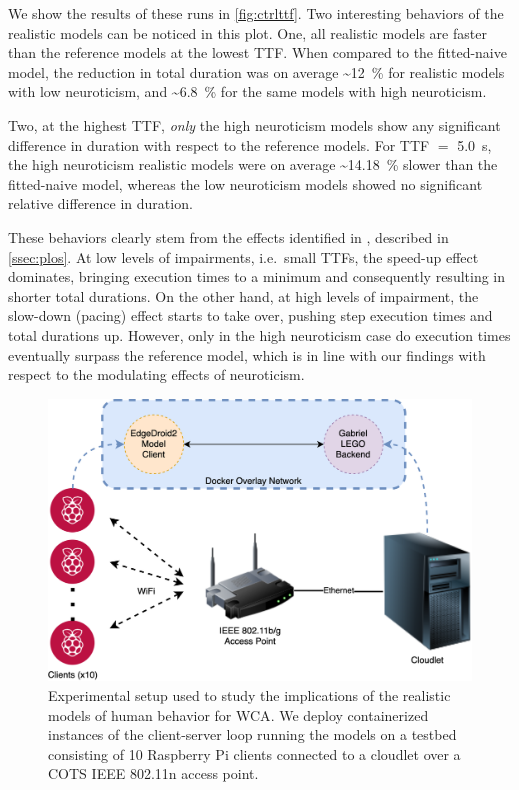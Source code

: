 We show the results of these runs in \cref{fig:ctrlttf}.
Two interesting behaviors of the realistic models can be noticed in this plot.
One, all realistic models are faster than the reference models at the lowest \gls{TTF}.
When compared to the fitted-naive model, the reduction in total duration was on average \textasciitilde\SI{12}{\percent} for realistic models with low neuroticism, and \textasciitilde\SI{6.8}{\percent} for the same models with high neuroticism.

Two, at the highest \gls{TTF}, \emph{only} the high neuroticism models show any significant difference in duration with respect to the reference models.
For \gls{TTF} \(=\) \SI{5.0}{s}, the high neuroticism realistic models were on average \textasciitilde\SI{14.18}{\percent} slower than the fitted-naive model, whereas the low neuroticism models showed no significant relative difference in duration.

These behaviors clearly stem from the effects identified in \textcite{olguinmunoz:impact2021}, described in \cref{ssec:plos}.
At low levels of impairments, i.e.\ small \glspl{TTF}, the speed-up effect dominates, bringing execution times to a minimum and consequently resulting in shorter total durations.
On the other hand, at high levels of impairment, the slow-down (pacing) effect starts to take over, pushing step execution times and total durations up.
However, only in the high neuroticism case do execution times eventually surpass the reference model, which is in line with our findings with respect to the modulating effects of neuroticism.

\medskip

\begin{figure}
    \centering
    \includegraphics[width=\columnwidth]{figs/EdgeDroid2ExperimentalSetup.png}
    \caption{%
        Experimental setup used to study the implications of the realistic models of human behavior for \gls{WCA}.
        We deploy containerized instances of the client-server loop running the models on a testbed consisting of \num{10} Raspberry Pi clients connected to a cloudlet over a \gls{COTS} \gls{IEEE} \num{802.11}n access point.
    }\label{fig:expsetup}
\end{figure}

